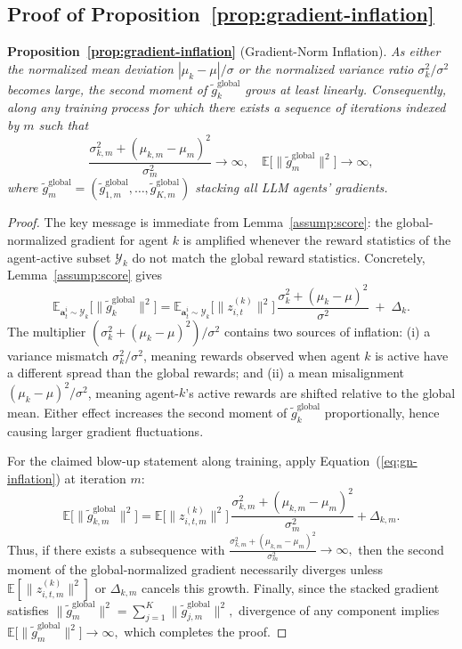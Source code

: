 \documentclass[]{fairmeta}
\theoremstyle{plain}
\theoremstyle{definition}
\theoremstyle{remark}
\begin{document}
\subsection{Proof of Proposition~\ref{prop:gradient-inflation}}
\label{app:proof_prop_gradient_inflation}
\textbf{Proposition~\ref{prop:gradient-inflation}} (Gradient-Norm Inflation).
\textit{
As either the normalized mean deviation
$|\mu_k - \mu| / \sigma$ or the normalized variance ratio
$\sigma_k^2 / \sigma^2$ becomes large, the second moment of
$\tilde{g}_k^{\mathrm{global}}$ grows at least linearly. Consequently, along any training process for which
there exists a sequence of iterations indexed by $m$ such that
$$
\frac{\sigma_{k,m}^2 + (\mu_{k,m} - \mu_m)^2}{\sigma_m^2} \to \infty, \quad  \mathbb{E}\bigl[\|\tilde{g}_m^{\mathrm{global}}\|^2\bigr] \to \infty,
$$
where $\tilde{g}_{m}^{\mathrm{global}} = (\tilde{g}_{1,m}^{\mathrm{global}},\dots,\tilde{g}_{K,m}^{\mathrm{global}})$ stacking all LLM agents' gradients.
}

\begin{proof}
The key message is immediate from Lemma~\ref{assump:score}: the global-normalized
gradient for agent $k$ is amplified whenever the reward statistics of the
agent-active subset $\mathcal{Y}_k$ do not match the global reward statistics.
Concretely, Lemma~\ref{assump:score} gives
\begin{equation}\label{eq:gn-inflation}
\mathbb{E}_{\bm{a}_t^i\sim \mathcal{Y}_k}\!\big[\|\tilde{g}_k^{\mathrm{global}}\|^2\big]
=
\mathbb{E}_{\bm{a}_t^i\sim \mathcal{Y}_k}\!\big[\|z_{i,t}^{(k)}\|^2\big]\,
\frac{\sigma_k^2 + (\mu_k - \mu)^2}{\sigma^2} \;+\; \Delta_k .
\end{equation}
The multiplier
\(
(\sigma_k^2 + (\mu_k-\mu)^2)/\sigma^2
\)
contains two sources of inflation: (i) a variance mismatch $\sigma_k^2/\sigma^2$, meaning rewards observed when agent $k$ is active have a different spread than the global rewards; and (ii) a mean misalignment $(\mu_k-\mu)^2/\sigma^2$, meaning agent-$k$'s active rewards are shifted relative to the global mean. Either effect increases the second moment of $\tilde{g}_k^{\mathrm{global}}$ proportionally, hence causing larger gradient fluctuations.

For the claimed blow-up statement along training, apply Equation~(\ref{eq:gn-inflation}) at
iteration $m$:
\[
\mathbb{E}\big[\|\tilde{g}_{k,m}^{\mathrm{global}}\|^2\big]
=
\mathbb{E}\big[\|z_{i,t,m}^{(k)}\|^2\big]\,
\frac{\sigma_{k,m}^2 + (\mu_{k,m} - \mu_m)^2}{\sigma_m^2}
+\Delta_{k,m}.
\]
Thus, if there exists a subsequence with
\(
\frac{\sigma_{k,m}^2 + (\mu_{k,m} - \mu_m)^2}{\sigma_m^2}\to\infty,
\)
then the second moment of the global-normalized gradient necessarily diverges
unless $\mathbb{E}[\|z_{i,t,m}^{(k)}\|^2]$ or $\Delta_{k,m}$ cancels this growth.
Finally, since the stacked gradient satisfies
\(
\|\tilde{g}_m^{\mathrm{global}}\|^2=\sum_{j=1}^K \|\tilde{g}_{j,m}^{\mathrm{global}}\|^2,
\)
divergence of any component implies
\(
\mathbb{E}\big[\|\tilde{g}_m^{\mathrm{global}}\|^2\big]\to\infty,
\)
which completes the proof.
\end{proof}
\end{document}
